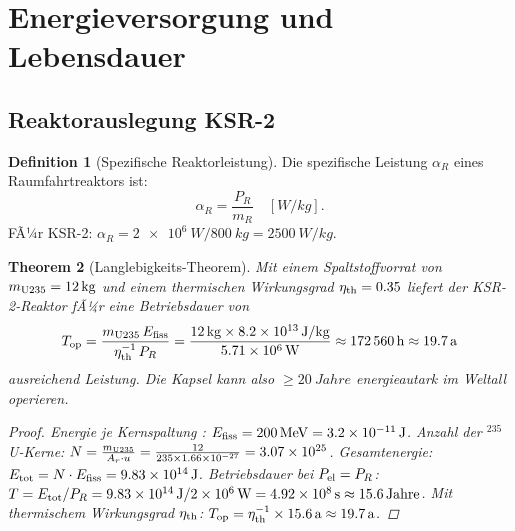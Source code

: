 ﻿\documentclass[a4paper,12pt,twoside]{article}
\theoremstyle{plain}
\newtheorem{theorem}{Theorem}[section]
\theoremstyle{definition}
\newtheorem{definition}[theorem]{Definition}
\theoremstyle{remark}
\begin{document}
	\section{Energieversorgung und Lebensdauer}
	\label{sec:power}
	
	\subsection{Reaktorauslegung KSR-2}
	
	\begin{definition}[Spezifische Reaktorleistung]
		Die spezifische Leistung $\alpha_R$ eines Raumfahrtreaktors ist:
		\begin{equation}
			\alpha_R = \frac{P_R}{m_R} \quad [\si{W/kg}].
		\end{equation}
		FÃ¼r KSR-2: $\alpha_R = \SI{2e6}{W} / \SI{800}{kg} = \SI{2500}{W/kg}$.
	\end{definition}
	
	\begin{theorem}[Langlebigkeits-Theorem]
		\label{thm:longevity}
		Mit einem Spaltstoffvorrat von $m_{\rm U235} = \SI{12}{kg}$ und einem
		thermischen Wirkungsgrad $\eta_{\rm th} = 0.35$ \cite{angelo1985, dewar2004} liefert der KSR-2-Reaktor
		fÃ¼r eine Betriebsdauer von
		\begin{equation}
			T_{\rm op} = \frac{m_{\rm U235}\,E_{\rm fiss}}{\eta_{\rm th}^{-1}\,P_R}
			= \frac{\SI{12}{kg}\times\SI{8.2e13}{J/kg}}{\SI{5.71e6}{W}}
			\approx \SI{172560}{h} \approx \SI{19.7}{a}
		\end{equation}
		ausreichend Leistung. Die Kapsel kann also $\geq \SI{20}{Jahre}$
		energieautark im Weltall operieren.
		\begin{proof}
			Energie je Kernspaltung \cite{lamarsh2001}: $E_{\rm fiss} = \SI{200}{MeV} = \SI{3.2e-11}{J}$.
			Anzahl der $^{235}$U-Kerne: $N = \frac{m_{\rm U235}}{A_r \cdot u}
			= \frac{12}{235\times\SI{1.66e-27}{}} = \SI{3.07e25}{}$.
			Gesamtenergie: $E_{\rm tot} = N\cdot E_{\rm fiss} = \SI{9.83e14}{J}$.
			Betriebsdauer bei $P_{\rm el} = P_R$: $T = E_{\rm tot}/P_R
			= \SI{9.83e14}{J} / \SI{2e6}{W} = \SI{4.92e8}{s} \approx 15.6\,\text{Jahre}$.
			Mit thermischem Wirkungsgrad $\eta_{\rm th}$: 
			$T_{\rm op} = \eta_{\rm th}^{-1}\times15.6\,\text{a} \approx \SI{19.7}{a}$.
			\qedhere
		\end{proof}
	\end{theorem}
	
\end{document}
